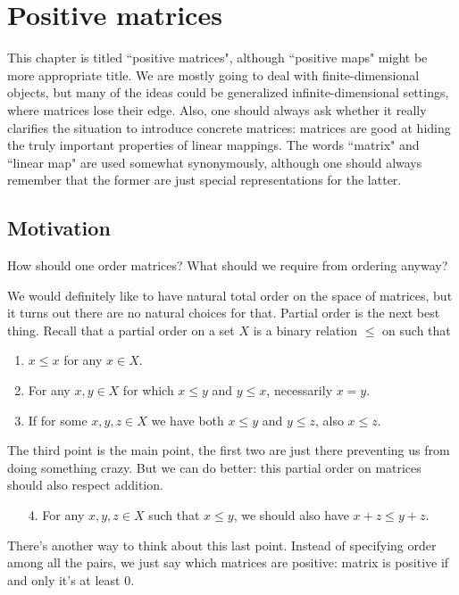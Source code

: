 \chapter{Positive matrices}

This chapter is titled ``positive matrices", although ``positive maps" might be more appropriate title. We are mostly going to deal with finite-dimensional objects, but many of the ideas could be generalized infinite-dimensional settings, where matrices lose their edge. Also, one should always ask whether it really clarifies the situation to introduce concrete matrices: matrices are good at hiding the truly important properties of linear mappings. The words ``matrix" and ``linear map" are used somewhat synonymously, although one should always remember that the former are just special representations for the latter.

\section{Motivation}

How should one order matrices? What should we require from ordering anyway?

We would definitely like to have natural total order on the space of matrices, but it turns out there are no natural choices for that. Partial order is the next best thing. Recall that a partial order on a set $X$ is a binary relation $\leq$ on such that
\begin{enumerate}
	\item $x \leq x$ for any $x \in X$.
	\item For any $x, y \in X$ for which $x \leq y$ and $y \leq x$, necessarily $x = y$.
	\item If for some $x, y, z \in X$ we have both $x \leq y$ and $y \leq z$, also $x \leq z$.
\end{enumerate}

The third point is the main point, the first two are just there preventing us from doing something crazy. But we can do better: this partial order on matrices should also respect addition.
\begin{enumerate}
\item[4.] For any $x, y, z \in X$ such that $x \leq y$, we should also have $x + z \leq y + z$.
\end{enumerate}

There's another way to think about this last point. Instead of specifying order among all the pairs, we just say which matrices are positive: matrix is positive if and only it's at least $0$.

